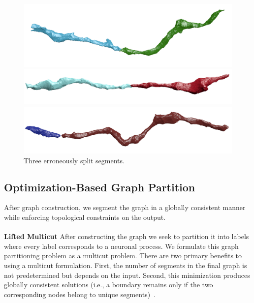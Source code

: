 \begin{figure}[t]
	\centering
	\begin{minipage}{0.32\linewidth}
		\includegraphics[width=\linewidth]{./figures/split_error1.png}		
	\end{minipage}
	\hfill
	\begin{minipage}{0.32\linewidth}
		\includegraphics[width=\linewidth]{./figures/split_error2.png}				
	\end{minipage}
	\hfill
	\begin{minipage}{0.32\linewidth}
		\includegraphics[width=\linewidth]{./figures/split_error3.png}
	\end{minipage}
	\caption{Three erroneously split segments.}
	\label{fig:merge_candidates}
\end{figure}
\subsection{Optimization-Based Graph Partition}

After graph construction, we segment the graph in a globally consistent manner while enforcing topological constraints on the output.
\\~\\
\noindent\textbf{Lifted Multicut}
After constructing the graph we seek to partition it into labels where every label corresponds to a neuronal process. 
We formulate this graph partitioning problem as a multicut problem.
There are two primary benefits to using a multicut formulation. 
First, the number of segments in the final graph is not predetermined but depends on the input. 
Second, this minimization produces globally consistent solutions (i.e., a boundary remains only if the two corresponding nodes belong to unique segments)~\cite{keuper2015efficient}.

